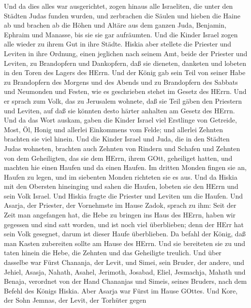  Und da dies alles war ausgerichtet, zogen hinaus alle
Israeliten, die unter den Städten Judas funden wurden, und zerbrachen
die Säulen und hieben die Haine ab und brachen ab die Höhen und Altäre
aus dem ganzen Juda, Benjamin, Ephraim und Manasse, bis sie sie gar
aufräumten. Und die Kinder Israel zogen alle wieder zu ihrem Gut in ihre
Städte.  Hiskia aber stellete die Priester und Leviten in
ihre Ordnung, einen jeglichen nach seinem Amt, beide der Priester und
Leviten, zu Brandopfern und Dankopfern, daß sie dieneten, danketen und
lobeten in den Toren des Lagers des HErrn.  Und der König
gab sein Teil von seiner Habe zu Brandopfern des Morgens und des Abends
und zu Brandopfern des Sabbats und Neumonden und Festen, wie es
geschrieben stehet im Gesetz des HErrn.  Und er sprach zum
Volk, das zu Jerusalem wohnete, daß sie Teil gäben den Priestern und
Leviten, auf daß sie könnten desto härter anhalten am Gesetz des HErrn.
 Und da das Wort auskam, gaben die Kinder Israel viel
Erstlinge von Getreide, Most, Öl, Honig und allerlei Einkommens vom
Felde; und allerlei Zehnten brachten sie viel hinein.  Und
die Kinder Israel und Juda, die in den Städten Judas wohneten, brachten
auch Zehnten von Rindern und Schafen und Zehnten von dem Geheiligten,
das sie dem HErrn, ihrem GOtt, geheiliget hatten, und machten hie einen
Haufen und da einen Haufen.  Im dritten Monden fingen sie
an, Haufen zu legen, und im siebenten Monden richteten sie es aus.
 Und da Hiskia mit den Obersten hineinging und sahen die
Haufen, lobeten sie den HErrn und sein Volk Israel.  Und
Hiskia fragte die Priester und Leviten um die Haufen.  Und
Asarja, der Priester, der Vornehmste im Hause Zadok, sprach zu ihm: Seit
der Zeit man angefangen hat, die Hebe zu bringen ins Haus des HErrn,
haben wir gegessen und sind satt worden, und ist noch viel überblieben;
denn der HErr hat sein Volk gesegnet, darum ist dieser Haufe
überblieben.  Da befahl der König, daß man Kasten
zubereiten sollte am Hause des HErrn. Und sie bereiteten sie zu
 und taten hinein die Hebe, die Zehnten und das Geheiligte
treulich. Und über dasselbe war Fürst Chananja, der Levit, und Simei,
sein Bruder, der andere,  und Jehiel, Asasja, Nahath,
Asahel, Jerimoth, Josabad, Eliel, Jesmachja, Mahath und Benaja,
verordnet von der Hand Chananjas und Simeis, seines Bruders, nach dem
Befehl des Königs Hiskia. Aber Asarja war Fürst im Hause GOttes.
 Und Kore, der Sohn Jemnas, der Levit, der Torhüter gegen
